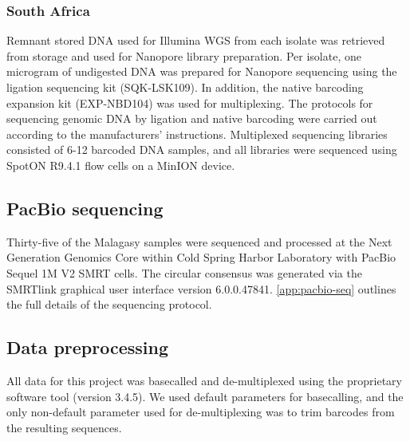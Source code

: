 \subsubsection{South Africa}
Remnant stored DNA used for Illumina WGS from each isolate was retrieved from storage and used for Nanopore library preparation. Per isolate, one microgram of undigested DNA was prepared for Nanopore sequencing using the ligation sequencing kit (SQK-LSK109). In addition, the native barcoding expansion kit (EXP-NBD104) was used for multiplexing. The protocols for sequencing genomic DNA by ligation and native barcoding were carried out according to the manufacturers’ instructions. Multiplexed sequencing libraries consisted of 6-12 barcoded DNA samples, and all libraries were sequenced using SpotON R9.4.1 flow cells on a MinION device.

\subsection{PacBio sequencing}
Thirty-five of the Malagasy samples were sequenced and processed at the Next Generation Genomics Core within Cold Spring Harbor Laboratory with PacBio Sequel 1M V2 SMRT cells. The circular consensus was generated via the SMRTlink graphical user interface version 6.0.0.47841. \autoref{app:pacbio-seq} outlines the full details of the sequencing protocol.

\subsection{Data preprocessing}

All \ont{} data for this project was basecalled and de-multiplexed using the \ont{} proprietary software tool \guppy{} (version 3.4.5). We used default parameters for basecalling, and the only non-default parameter used for de-multiplexing was to trim barcodes from the resulting sequences.  


